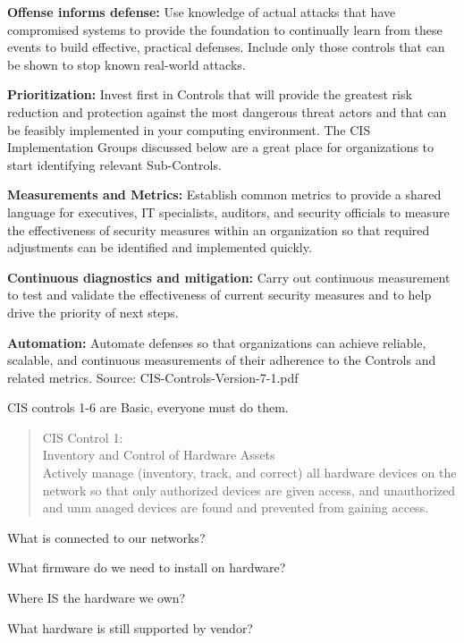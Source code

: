 \documentclass[Screen16to9,17pt]{foils}
\begin{document}
\begin{list2}
\item {\bf Offense informs defense:} Use knowledge of actual attacks that have
compromised systems to provide the foundation to continually learn
from these events to build effective, practical defenses. Include only
those controls that can be shown to stop known real-world attacks.
\item {\bf Prioritization:} Invest first in Controls that will provide the greatest risk
reduction and protection against the most dangerous threat actors
and that can be feasibly implemented in your computing environment.
The CIS Implementation Groups discussed below are a great place for
organizations to start identifying relevant Sub-Controls.
\item {\bf Measurements and Metrics:} Establish common metrics to provide a
shared language for executives, IT specialists, auditors, and security
officials to measure the effectiveness of security measures within
an organization so that required adjustments can be identified and
implemented quickly.
\item {\bf Continuous diagnostics and mitigation:} Carry out continuous
measurement to test and validate the effectiveness of current security
measures and to help drive the priority of next steps.
\item {\bf Automation:} Automate defenses so that organizations can achieve
reliable, scalable, and continuous measurements of their adherence to
the Controls and related metrics. \hskip 2cm Source: CIS-Controls-Version-7-1.pdf
\end{list2}


CIS controls 1-6 are Basic, everyone must do them.


\begin{quote}
CIS Control 1:\\
Inventory and Control of Hardware Assets\\
Actively manage (inventory, track, and correct) all hardware devices on the network so that only authorized devices are given access, and unauthorized and unm
anaged devices are found and prevented from gaining access.
\end{quote}

\begin{list1}
\item What is connected to our networks?
\item What firmware do we need to install on hardware?
\item Where IS the hardware we own?
\item What hardware is still supported by vendor?
\end{list1}
\end{document}
